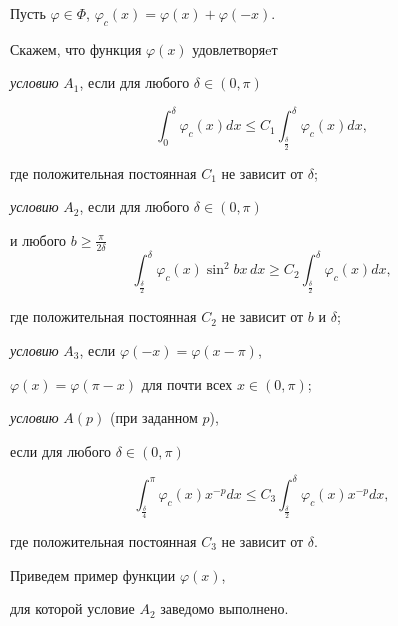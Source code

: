 Пусть $\varphi\in\Phi$, $\varphi_c(x)=\varphi(x)+\varphi(-x)$.


Скажем, что функция $\varphi(x)$ удовлетворяeт 





{\it условию} $A_1$, если для любого $\delta\in (0,\pi)$ 


$$


\int_{0}^{\delta}\varphi_c(x) dx \leq


C_1\int_{\frac{\delta}{2}}^{\delta}\varphi_c(x) dx,


$$


где положительная постоянная $C_1$ не зависит от $\delta$;





{\it условию} $A_2$, если для любого $\delta\in (0,\pi)$


и любого $b\geq \frac{\pi}{2\delta}$\\


$$


\int_{\frac{\delta}{2}}^{\delta}\varphi_c(x)\sin^2 bx\, dx \geq


C_2\int_{\frac{\delta}{2}}^{\delta}\varphi_c(x) dx,


$$


где положительная постоянная $C_2$ не зависит от $b$ и $\delta$;





{\it условию} $A_3$, если $\varphi(-x)=\varphi(x-\pi)$,


$\varphi(x)=\varphi(\pi-x)$ для почти всех $x\in (0,\pi)$;





{\it условию} $A(p)$ (при заданном $p$), 


если для любого $\delta\in (0,\pi)$ 


$$


\int_{\frac{\delta}{4}}^{\pi}\varphi_c(x) x^{-p} dx \leq


C_3\int_{\frac{\delta}{2}}^{\delta}\varphi_c(x) x^{-p}dx,


$$


где положительная постоянная $C_3$ не зависит от $\delta$.





Приведем пример функции $\varphi (x)$, 


для которой условие $A_2$ заведомо выполнено.


